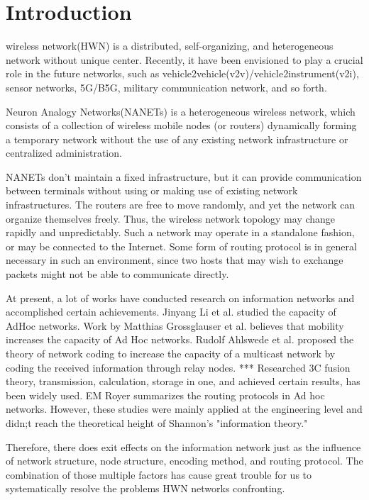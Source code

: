 \documentclass[journal,comsoc]{IEEEtran}
\begin{document}
	\IEEEpeerreviewmaketitle
	
	\section{Introduction}
	\label{section: introduction}
		 wireless network(HWN) is a distributed, self-organizing, and heterogeneous network without unique center.
		Recently, it have been envisioned to play a crucial role in the future networks, 
		such as vehicle2vehicle(v2v)/vehicle2instrument(v2i), sensor networks, 5G/B5G, military communication network, and so forth.
		
		Neuron Analogy Networks(NANETs) is a heterogeneous wireless network, which consists of a collection of wireless mobile nodes (or routers) dynamically forming a temporary network without the use of any existing network infrastructure or centralized administration.
		
		NANETs don't maintain a fixed infrastructure, but it can provide communication between terminals without using or making use of existing network infrastructures.
		The routers are free to move randomly, and yet the network can organize themselves freely. 
		Thus, the wireless network topology may change rapidly and unpredictably. 
		Such a network may operate in a standalone fashion, or may be connected to the Internet. 
		Some form of routing protocol is in general necessary in such an environment, 
		since two hosts that may wish to exchange packets might not be able to communicate directly.
		
		At present, a lot of works have conducted research on information networks and accomplished certain achievements.
		Jinyang Li et al. studied the capacity of AdHoc networks.
		Work by Matthias Grossglauser et al. believes that mobility increases the capacity of Ad Hoc networks.
		Rudolf Ahlswede et al. proposed the theory of network coding to increase the capacity of a multicast network by coding the received information through relay nodes.
		*** Researched 3C fusion theory, transmission, calculation, storage in one, and achieved certain results, has been widely used.
		EM Royer summarizes the routing protocols in Ad hoc networks.
		However, these studies were mainly applied at the engineering level and didn;t reach the theoretical height of Shannon's "information theory." \par
		
		Therefore, there does exit effects on the information network just as the influence of network structure, node structure, encoding method, and routing protocol.
		The combination of those multiple factors has cause great trouble for us to systematically resolve the problems HWN networks confronting.
		
\end{document}
